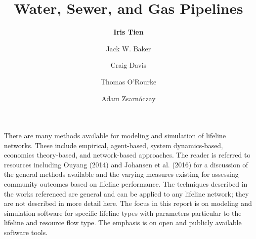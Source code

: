 %
%
%


%
%
%
%
%
%
%
%

\title{Water, Sewer, and Gas Pipelines}
\author{
    \textbf{Iris Tien}
    \and {Jack W. Baker}
    \and {Craig Davis}
    \and {Thomas O'Rourke}
    \and {Adam Zsarnóczay}}
\tocauthor{}
%
%
\maketitle

There are many methods available for modeling and simulation of lifeline networks. These include empirical, agent-based, system dynamics-based, economics theory-based, and network-based approaches. The reader is referred to resources including Ouyang (2014) and Johansen et al. (2016) for a discussion of the general methods available and the varying measures existing for assessing community outcomes based on lifeline performance. The techniques described in the works referenced are general and can be applied to any lifeline network; they are not described in more detail here. The focus in this report is on modeling and simulation software for specific lifeline types with parameters particular to the lifeline and resource flow type. The emphasis is on open and publicly available software tools.

